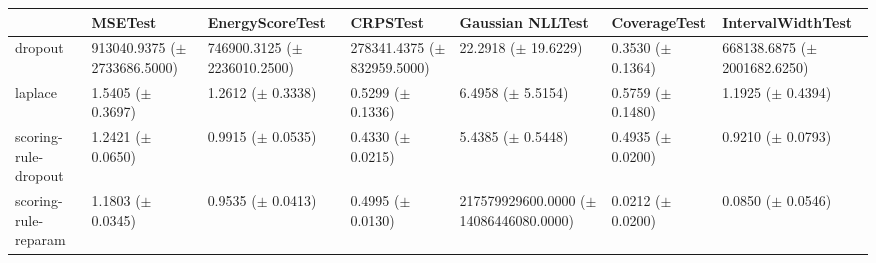 \begin{tabular}{lllllll}
\toprule
 & MSETest & EnergyScoreTest & CRPSTest & Gaussian NLLTest & CoverageTest & IntervalWidthTest \\
\midrule
dropout & \makecell{913040.9375 \\ ($\pm$ 2733686.5000)} & \makecell{746900.3125 \\ ($\pm$ 2236010.2500)} & \makecell{278341.4375 \\ ($\pm$ 832959.5000)} & \makecell{22.2918 \\ ($\pm$ 19.6229)} & \makecell{0.3530 \\ ($\pm$ 0.1364)} & \makecell{668138.6875 \\ ($\pm$ 2001682.6250)} \\
laplace & \makecell{1.5405 \\ ($\pm$ 0.3697)} & \makecell{1.2612 \\ ($\pm$ 0.3338)} & \makecell{0.5299 \\ ($\pm$ 0.1336)} & \makecell{6.4958 \\ ($\pm$ 5.5154)} & \makecell{0.5759 \\ ($\pm$ 0.1480)} & \makecell{1.1925 \\ ($\pm$ 0.4394)} \\
scoring-rule-dropout & \makecell{1.2421 \\ ($\pm$ 0.0650)} & \makecell{0.9915 \\ ($\pm$ 0.0535)} & \makecell{0.4330 \\ ($\pm$ 0.0215)} & \makecell{5.4385 \\ ($\pm$ 0.5448)} & \makecell{0.4935 \\ ($\pm$ 0.0200)} & \makecell{0.9210 \\ ($\pm$ 0.0793)} \\
scoring-rule-reparam & \makecell{1.1803 \\ ($\pm$ 0.0345)} & \makecell{0.9535 \\ ($\pm$ 0.0413)} & \makecell{0.4995 \\ ($\pm$ 0.0130)} & \makecell{217579929600.0000 \\ ($\pm$ 14086446080.0000)} & \makecell{0.0212 \\ ($\pm$ 0.0200)} & \makecell{0.0850 \\ ($\pm$ 0.0546)} \\
\bottomrule
\end{tabular}
